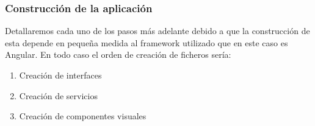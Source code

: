 \subsubsection{Construcción de la aplicación}
Detallaremos cada uno de los pasos más adelante debido a que la construcción de esta depende en pequeña medida al framework utilizado que en este caso es Angular. En todo caso el orden de creación de ficheros sería:
\begin{enumerate}
    \item Creación de interfaces
    \item Creación de servicios
    \item Creación de componentes visuales
\end{enumerate}
